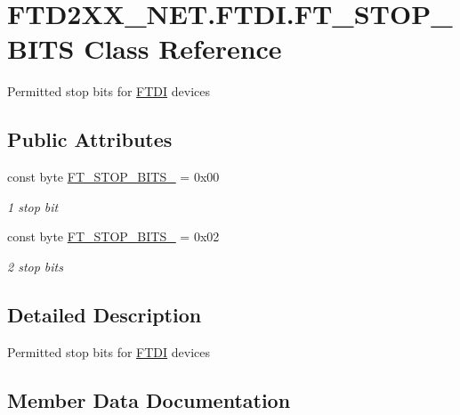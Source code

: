 \hypertarget{class_f_t_d2_x_x___n_e_t_1_1_f_t_d_i_1_1_f_t___s_t_o_p___b_i_t_s}{}\section{F\+T\+D2\+X\+X\+\_\+\+N\+E\+T.\+F\+T\+D\+I.\+F\+T\+\_\+\+S\+T\+O\+P\+\_\+\+B\+I\+TS Class Reference}
\label{class_f_t_d2_x_x___n_e_t_1_1_f_t_d_i_1_1_f_t___s_t_o_p___b_i_t_s}


Permitted stop bits for \mbox{\hyperlink{class_f_t_d2_x_x___n_e_t_1_1_f_t_d_i}{F\+T\+DI}} devices  


\subsection*{Public Attributes}
\begin{DoxyCompactItemize}
\item 
const byte \mbox{\hyperlink{class_f_t_d2_x_x___n_e_t_1_1_f_t_d_i_1_1_f_t___s_t_o_p___b_i_t_s_ab1bf2c8ac6d147aaff15fa404369dd8d}{F\+T\+\_\+\+S\+T\+O\+P\+\_\+\+B\+I\+T\+S\+\_}} = 0x00
\begin{DoxyCompactList}\small\item\em 1 stop bit \end{DoxyCompactList}\item 
const byte \mbox{\hyperlink{class_f_t_d2_x_x___n_e_t_1_1_f_t_d_i_1_1_f_t___s_t_o_p___b_i_t_s_afa8ab2761619e09e19f330bdd35fbf74}{F\+T\+\_\+\+S\+T\+O\+P\+\_\+\+B\+I\+T\+S\+\_}} = 0x02
\begin{DoxyCompactList}\small\item\em 2 stop bits \end{DoxyCompactList}\end{DoxyCompactItemize}


\subsection{Detailed Description}
Permitted stop bits for \mbox{\hyperlink{class_f_t_d2_x_x___n_e_t_1_1_f_t_d_i}{F\+T\+DI}} devices 



\subsection{Member Data Documentation}
\mbox{\label{class_f_t_d2_x_x___n_e_t_1_1_f_t_d_i_1_1_f_t___s_t_o_p___b_i_t_s_ab1bf2c8ac6d147aaff15fa404369dd8d}} 
